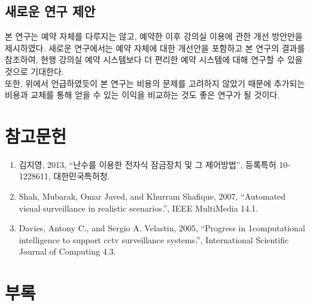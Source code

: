 \documentclass[11pt,a4paper]{article}
\begin{document}
\subsection{새로운 연구 제안}
본 연구는 예약 자체를 다루지는 않고, 예약한 이후 강의실 이용에 관한 개선 방안만을 제시하였다. 새로운 연구에서는 예약 자체에 대한 개선안을 포함하고 본 연구의 결과를 참조하여, 현행 강의실 예약 시스템보다 더 편리한 예약 시스템에 대해 연구할 수 있을 것으로 기대한다.\\
또한, 위에서 언급하였듯이 본 연구는 비용의 문제를 고려하지 않았기 때문에 추가되는 비용과 교체를 통해 얻을 수 있는 이익을 비교하는 것도 좋은 연구가 될 것이다.

\section{참고문헌}
\begin{enumerate}
\item 김지영, 2013, “난수를 이용한 전자식 잠금장치 및 그 제어방법”, 등록특허 10-1228611, 대한민국특허청.
\item Shah, Mubarak, Omar Javed, and Khurram Shafique, 2007, “Automated visual surveillance in realistic scenarios.”, IEEE MultiMedia 14.1.
\item Davies, Antony C., and Sergio A. Velastin, 2005, “Progress in 1computational intelligence to support cctv surveillance systems.”, International Scientific Journal of Computing 4.3.
\end{enumerate}

\section{부록}
\end{document}
